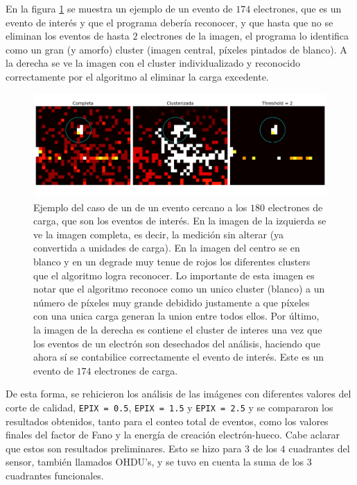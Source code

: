 \indent En la figura \ref{fig:ClusterPegoteado} se muestra un ejemplo de un evento de $174$ electrones, que es un evento de interés y que el programa debería reconocer, y que hasta que no se eliminan los eventos de hasta $2$ electrones de la imagen, el programa lo identifica como un gran (y amorfo) cluster (imagen central, píxeles pintados de blanco). A la derecha se ve la imagen con el cluster individualizado y reconocido correctamente por el algoritmo al eliminar la carga excedente.
\begin{figure}[H]
    \centering
    \includegraphics[scale=0.4]{Figs/despegoteo_clusters.pdf}
    \caption{\footnotesize{Ejemplo del caso de un de un evento cercano a los $180$ electrones de carga, que son los eventos de interés. En la imagen de la izquierda se ve la imagen completa, es decir, la medición sin alterar (ya convertida a unidades de carga). En la imagen del centro se en blanco y en un degrade muy tenue de rojos los diferentes clusters que el algoritmo logra reconocer. Lo importante de esta imagen es notar que el algoritmo reconoce como un unico cluster (blanco) a un número de píxeles muy grande debidido justamente a que píxeles con una unica carga generan la union entre todos ellos. Por último, la imagen de la derecha es contiene el cluster de interes una vez que los eventos de un electrón son desechados del análisis, haciendo que ahora sí se contabilice correctamente el evento de interés. Este es un evento de $174$ electrones de carga.}}
    \label{fig:ClusterPegoteado}
\end{figure}
De esta forma, se rehicieron los análisis de las imágenes con diferentes valores del corte de calidad, \verb|EPIX = 0.5|, \verb|EPIX = 1.5| y \verb|EPIX = 2.5| y se compararon los resultados obtenidos, tanto para el conteo total de eventos, como los valores finales del factor de Fano y la energía de creación electrón-hueco. Cabe aclarar que estos son resultados preliminares. Esto se hizo para $3$ de los $4$ cuadrantes del sensor, también llamados OHDU's, y se tuvo en cuenta la suma de los 3 cuadrantes funcionales.\\
